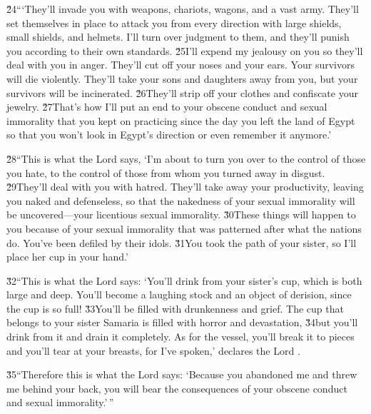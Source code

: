 \v{24}```They'll invade you with weapons, chariots, wagons, and a vast army. They'll set themselves in place to attack you from every direction with large shields, small shields, and helmets. I'll turn over judgment to them, and they'll punish you according to their own standards. \v{25}I'll expend my jealousy on you so they'll deal with you in anger. They'll cut off your noses and your ears. Your survivors will die violently. They'll take your sons and daughters away from you, but your survivors will be incinerated. \v{26}They'll strip off your clothes and confiscate your jewelry. \v{27}That's how I'll put an end to your obscene conduct and sexual immorality that you kept on practicing since the day you left the land of Egypt so that you won't look in Egypt's direction or even remember it anymore.'

\v{28}``This is what the Lord  says, `I'm about to turn you over to the control of those you hate, to the control of those from whom you turned away in disgust. \v{29}They'll deal with you with hatred. They'll take away your productivity, leaving you naked and defenseless, so that the nakedness of your sexual immorality will be uncovered---your licentious sexual immorality. \v{30}These things will happen to you because of your sexual immorality that was patterned after what the nations do. You've been defiled by their idols. \v{31}You took the path of your sister, so I'll place her cup in your hand.'

\v{32}``This is what the Lord  says: `You'll drink from your sister's cup, which is both large and deep. You'll become a laughing stock and an object of derision, since the cup is so full! \v{33}You'll be filled with drunkenness and grief. The cup that belongs to your sister Samaria is filled with horror and devastation, \v{34}but you'll drink from it and drain it completely. As for the vessel, you'll break it to pieces and you'll tear at your breasts, for I've spoken,' declares the Lord .

\v{35}``Therefore this is what the Lord  says: `Because you abandoned me and threw me behind your back, you will bear the consequences of your obscene conduct and sexual immorality.'\,''

